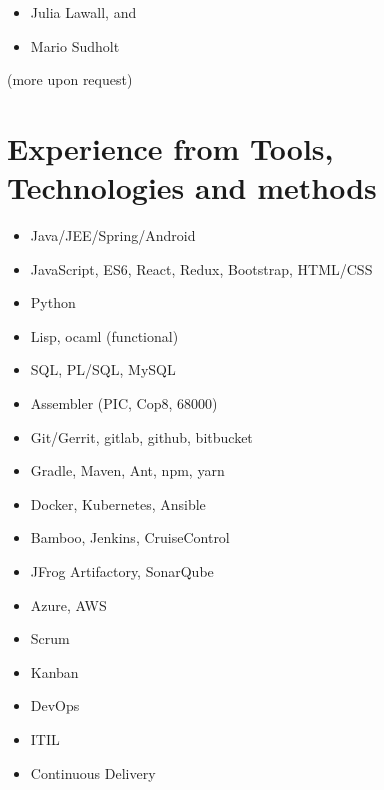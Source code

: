 \documentclass[11pt,a4paper,sans]{moderncv}
\begin{document}
{\begin{cvcolumns}
    {\begin{itemize}
            \item Julia Lawall, and
            \item   Mario Sudholt
    \end{itemize}(more upon request)}
\end{cvcolumns}
\footnotesize
\section{Experience from Tools, Technologies and methods}
\begin{cvcolumns}
        {\begin{itemize}
            \item Java/JEE/Spring/Android 
            \item JavaScript, ES6, React, Redux, Bootstrap, HTML/CSS
            \item Python
            \item Lisp, ocaml  (functional)
            \item SQL, PL/SQL, MySQL 
            \item Assembler (PIC, Cop8, 68000) 
        \end{itemize}}
	{\begin{itemize}
        \item Git/Gerrit, gitlab, github, bitbucket 
        \item Gradle, Maven, Ant, npm, yarn
        \item Docker, Kubernetes, Ansible
        \item Bamboo, Jenkins, CruiseControl 
        \item JFrog Artifactory, SonarQube
        \item Azure, AWS 
    \end{itemize}}
\end{cvcolumns} 
\begin{cvcolumns}
	{\begin{itemize}
            \item Scrum
            \item Kanban
            \item DevOps
            \item ITIL
            \item Continuous Delivery 

\end{itemize}}
\end{cvcolumns}}
\end{document}
